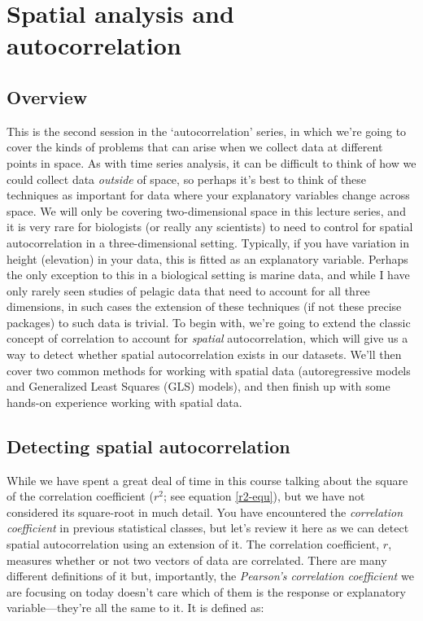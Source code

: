 
\chapter{Spatial analysis and autocorrelation}
\section*{Overview}
This is the second session in the `autocorrelation' series, in which
we're going to cover the kinds of problems that can arise when we
collect data at different points in space. As with time series
analysis, it can be difficult to think of how we could collect data
\emph{outside} of space, so perhaps it's best to think of these
techniques as important for data where your explanatory variables
change across space. We will only be covering two-dimensional space in
this lecture series, and it is very rare for biologists (or really any
scientists) to need to control for spatial autocorrelation in a
three-dimensional setting. Typically, if you have variation in height
(elevation) in your data, this is fitted as an explanatory
variable. Perhaps the only exception to this in a biological setting
is marine data, and while I have only rarely seen studies of pelagic
data that need to account for all three dimensions, in such cases the
extension of these techniques (if not these precise packages) to such
data is trivial. To begin with, we're going to extend the classic
concept of correlation to account for \emph{spatial} autocorrelation,
which will give us a way to detect whether spatial autocorrelation
exists in our datasets. We'll then cover two common methods for
working with spatial data (autoregressive models and Generalized Least
Squares (GLS) models), and then finish up with some hands-on
experience working with spatial data.

\section{Detecting spatial autocorrelation}
While we have spent a great deal of time in this course talking about
the square of the correlation coefficient ($r^2$; see equation
\ref{r2-equ}), but we have not considered its square-root in much
detail. You have encountered the \emph{correlation coefficient} in
previous statistical classes, but let's review it here as we can
detect spatial autocorrelation using an extension of it. The
correlation coefficient, $r$, measures whether or not two vectors of
data are correlated. There are many different definitions of it but,
importantly, the \emph{Pearson's correlation coefficient} we are
focusing on today doesn't care which of them is the response or
explanatory variable---they're all the same to it. It is defined as:

